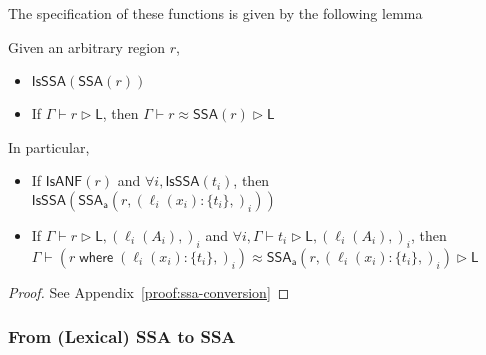 \documentclass[acmsmall,screen,review]{acmart}
\newcommand{\ms}[1]{\ensuremath{\mathsf{#1}}}
\newcommand{\lto}{:}
\newcommand{\where}[2]{#1\;\ms{where}\;#2}
\newcommand{\wbranch}[3]{#1(#2) \lto \{#3\}}
\newcommand{\haslb}[3]{#1 \vdash #2 \rhd #3}
\newcommand{\teqv}{\approx}
\newcommand{\lbeq}[4]{#1 \vdash #2 \teqv #3 \rhd {#4}}
\newcommand{\isanf}[1]{\ms{IsANF}(#1)}
\newcommand{\isssa}[1]{\ms{IsSSA}(#1)}
\newcommand{\tossa}[1]{\ms{SSA}(#1)}
\newcommand{\ssawhere}[2]{\ms{SSA}_{\ms{a}}(#1, #2)}
\begin{document}
The specification of these functions is given by the following lemma
\begin{lemma}[name=SSA conversion, restate=ssaconversion]
  Given an arbitrary region $r$,
  \begin{itemize}
    \item $\isssa{\tossa{r}}$
    \item If $\haslb{\Gamma}{r}{\ms{L}}$, then $\lbeq{\Gamma}{r}{\tossa{r}}{\ms{L}}$
  \end{itemize}
  In particular,
  \begin{itemize}
    \item If $\isanf{r}$ and $\forall i, \isssa{t_i}$, then 
      $\isssa{\ssawhere{r}{(\wbranch{\ell_i}{x_i}{t_i},)_i}}$
    \item If $\haslb{\Gamma}{r}{\ms{L}, (\ell_i(A_i),)_i}$ and 
      $\forall i, \haslb{\Gamma}{t_i}{\ms{L}, (\ell_i(A_i),)_i}$, then 
      $\lbeq{\Gamma}
        {(\where{r}{(\wbranch{\ell_i}{x_i}{t_i},)_i})  }
        {\ssawhere{r}{(\wbranch{\ell_i}{x_i}{t_i},)_i}}{\ms{L}}$
  \end{itemize}
\end{lemma}
\begin{proof}
  See Appendix~\ref{proof:ssa-conversion}
\end{proof}

\subsubsection{From (Lexical) SSA to SSA}
\end{document}
